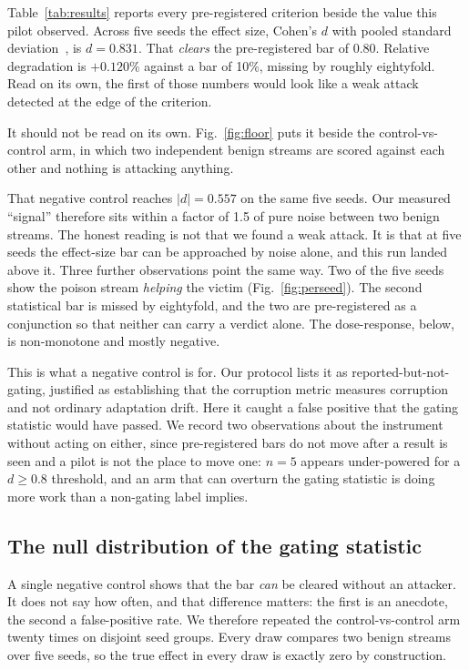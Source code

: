 


Table~\ref{tab:results} reports every pre-registered criterion beside the value
this pilot observed. Across five seeds the effect size, Cohen's $d$ with pooled
standard deviation~\cite{cohen1988}, is $d = 0.831$. That \emph{clears} the
pre-registered bar of 0.80. Relative degradation is $+0.120\%$ against a bar of
10\%, missing by roughly eightyfold. Read on its own, the first of those numbers
would look like a weak attack detected at the edge of the criterion.

It should not be read on its own. Fig.~\ref{fig:floor} puts it beside the
control-vs-control arm, in which two independent benign streams are scored
against each other and nothing is attacking anything.



That negative control reaches $|d| = 0.557$ on the same five seeds. Our measured
``signal'' therefore sits within a factor of 1.5 of pure noise between two benign
streams. The honest reading is not that we found a weak attack. It is that
at five seeds the effect-size bar can be approached by noise alone, and
this run landed above it. Three further observations point the same way. Two of
the five seeds show the poison stream \emph{helping} the victim
(Fig.~\ref{fig:perseed}). The second statistical bar is missed by eightyfold, and
the two are pre-registered as a conjunction so that neither can carry a verdict
alone. The dose-response, below, is non-monotone and mostly negative.

This is what a negative control is for. Our protocol lists it as
reported-but-not-gating, justified as establishing that the corruption metric
measures corruption and not ordinary adaptation drift. Here it caught a false
positive that the gating statistic would have passed. We record two observations
about the instrument without acting on either, since pre-registered bars do not
move after a result is seen and a pilot is not the place to move one: $n=5$
appears under-powered for a $d \geq 0.8$ threshold, and an arm that can overturn
the gating statistic is doing more work than a non-gating label implies.

\subsection{The null distribution of the gating statistic}
\label{sec:null}

A single negative control shows that the bar \emph{can} be cleared without an
attacker. It does not say how often, and that difference matters: the first is an
anecdote, the second a false-positive rate. We therefore repeated the
control-vs-control arm twenty times on disjoint seed groups. Every draw compares
two benign streams over five seeds, so the true effect in every draw is exactly
zero by construction.

